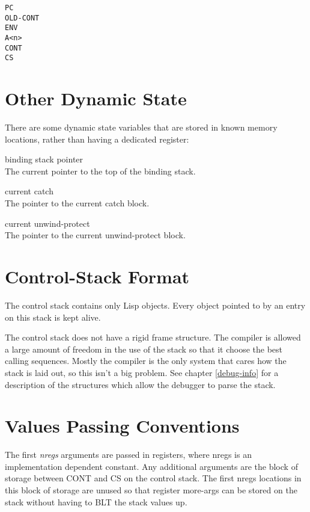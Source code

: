 {\begin{itemize, spread 0, spacing 1}
\begin{verbatim}
PC
OLD-CONT
ENV
A<n>
CONT
CS
\end{verbatim}

\section{Other Dynamic State}

There are some dynamic state variables that are stored in known memory
locations, rather than having a dedicated register:
\begin{description}
binding stack pointer\\The current pointer to the top of the binding stack.

current catch\\The pointer to the current catch block.

current unwind-protect\\The pointer to the current unwind-protect block.
\end{description}




\section{Control-Stack Format}
\label{Control-Stack-Format}


The control stack contains only Lisp objects.  Every object pointed to by an
entry on this stack is kept alive.

The \rtccl control stack does not have a rigid frame structure.  The compiler
is allowed a large amount of freedom in the use of the stack so that it choose
the best calling sequences.  Mostly the compiler is the only system that cares
how the stack is laid out, so this isn't a big problem.  See chapter
\ref{debug-info} for a description of the structures which allow the debugger
to parse the stack.



\section{Values Passing Conventions}


The first {\it nregs} arguments are passed in registers, where nregs is an
implementation dependent constant.  Any additional arguments are the block of
storage between CONT and CS on the control stack.  The first nregs locations in
this block of storage are unused so that register more-args can be stored on
the stack without having to BLT the stack values up.


\end{itemize, spread 0, spacing 1}}
